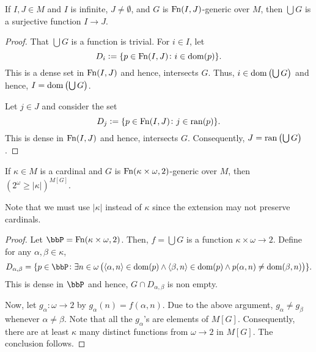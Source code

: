 \begin{lemma}
    If $I, J\in M$ and $I$ is infinite, $J\ne\emptyset$, and $G$ is $\operatorname{Fn}(I, J)$-generic over $M$, then $\bigcup G$ is a surjective function $I\to J$.
\end{lemma}
\begin{proof}
    That $\bigcup G$ is a function is trivial. For $i\in I$, let 
    \begin{equation*}
        D_i := \{p\in\operatorname{Fn}(I, J)\colon i\in\operatorname{dom}(p)\}.
    \end{equation*}
    This is a dense set in $\operatorname{Fn}(I, J)$ and hence, intersects $G$. Thus, $i\in\operatorname{dom}\left(\bigcup G\right)$ and hence, $I = \operatorname{dom}\left(\bigcup G\right)$.

    Let $j\in J$ and consider the set 
    \begin{equation*}
        D_j := \{p\in\operatorname{Fn}(I, J)\colon j\in\operatorname{ran}(p)\}.
    \end{equation*}
    This is dense in $\operatorname{Fn}(I, J)$ and hence, intersects $G$. Consequently, $J = \operatorname{ran}\left(\bigcup G\right)$.
\end{proof}

\begin{lemma}
    If $\kappa\in M$ is a cardinal and $G$ is $\operatorname{Fn}(\kappa\times\omega, 2)$-generic over $M$, then $(2^\omega\ge|\kappa|)^{M[G]}$. 

    Note that we must use $|\kappa|$ instead of $\kappa$ since the extension may not preserve cardinals.
\end{lemma}
\begin{proof}
    Let $\bbP = \Fn(\kappa\times\omega, 2)$. Then, $f = \bigcup G$ is a function $\kappa\times\omega\to 2$. Define for any $\alpha,\beta\in\kappa$,
    \begin{equation*}
        D_{\alpha,\beta} = \{p\in\bbP\colon \exists n\in\omega\left(\langle\alpha, n\rangle\in\dom(p)\wedge\langle\beta, n\rangle\in\dom(p)\wedge p(\alpha, n)\ne\dom(\beta, n)\right)\}.
    \end{equation*}
    This is dense in $\bbP$ and hence, $G\cap D_{\alpha,\beta}$ is non empty. 

    Now, let $g_\alpha:\omega\to 2$ by $g_\alpha(n) = f(\alpha, n)$. Due to the above argument, $g_\alpha\ne g_\beta$ whenever $\alpha\ne\beta$. Note that all the $g_\alpha$'s are elements of $M[G]$. Consequently, there are at least $\kappa$ many distinct functions from $\omega\to 2$ in $M[G]$. The conclusion follows.
\end{proof}

